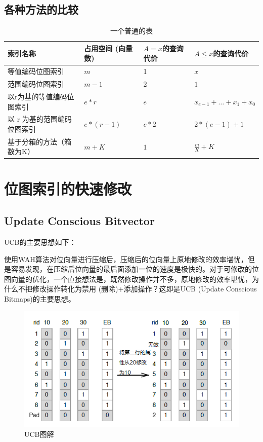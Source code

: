 \documentclass[11pt, a4paper]{article}
\begin{document}
  \subsection{各种方法的比较}

  \begin{table}[H]
    \centering
    \begin{tabular}{|l|l|l|l|}
      \hline
      索引名称 & 占用空间 (向量数) & $A=x$的查询代价 & $A\leq x$的查询代价 \\
      \hline
      等值编码位图索引 & $m$ & 1 & $x$ \\
      \hline
      范围编码位图索引 & $m-1$ & 2 & $1$ \\
      \hline
      以r为基的等值编码位图索引 & $e*r$ & $e$ & $x_{e- 1} + … + x_1 + x_0$ \\
      \hline
      以 r 为基的范围编码位图索引 & $e*(r - 1)$ & $e*2$ & $2*(e - 1)+1$ \\
      \hline
      基于分箱的方法（箱数为K） & $m+K$ & $1$ & $\frac{m}{K} + K$\\
      \hline
    \end{tabular}
    \label{tb:table} \caption{一个普通的表}
  \end{table}


  \section{位图索引的快速修改}

  \subsection{Update Conscious Bitvector}

  UCB的主要思想如下：

  使用WAH\cite{art5}算法对位向量进行压缩后，压缩后的位向量上原地修改的效率堪忧，但是容易发现，在压缩后位向量的最后面添加一位的速度是极快的。对于可修改的位图向量的优化，一个直接想法是，既然修改操作并不多，原地修改的效率堪忧，为什么不把修改操作转化为禁用 (删除)+添加操作？这即是UCB (Update Conscious Bitmaps)的主要思想。\cite{art2}

  \begin{figure}[H]
    \centering
      \includegraphics[width=5.5in]{ucb.png}
      \caption{UCB图解}\label{fig:ucb}
  \end{figure}
\end{document}
